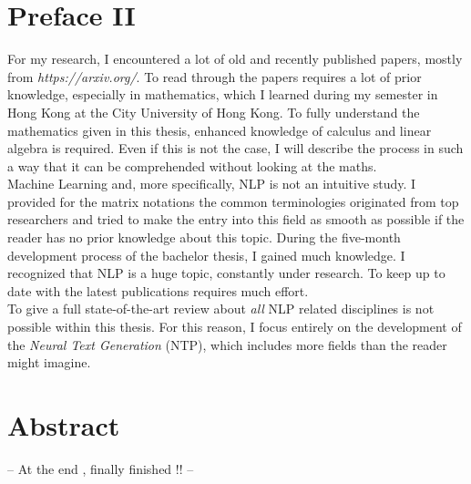\section*{Preface II}
\label{sec:prolog_2}
For my research, I encountered a lot of old and recently published papers, mostly from \textit{https://arxiv.org/}. 
To read through the papers requires a lot of prior knowledge, especially in mathematics, which I learned during my semester in Hong Kong at the City University of Hong Kong. 
To fully understand the mathematics given in this thesis, enhanced knowledge of calculus and linear algebra is required. Even if this is not the case, I will describe the process in such a way that it can be comprehended without looking at the maths. \\
Machine Learning and, more specifically, NLP is not an intuitive study. I provided for the matrix notations the common terminologies originated from top researchers and tried to make the entry into this field as smooth as possible if the reader has no prior knowledge about this topic.
During the five-month development process of the bachelor thesis, I gained much knowledge. I recognized that NLP is a huge topic, constantly under research. To keep up to date with the latest publications requires much effort. \\
To give a full state-of-the-art review about \textit{all} NLP related disciplines is not possible within this thesis. For this reason, I focus entirely on the development of the \textit{Neural Text Generation} (NTP), which includes more fields than the reader might imagine.




\section*{Abstract}
\label{sec:abstract}

-- At the end , finally finished !! --